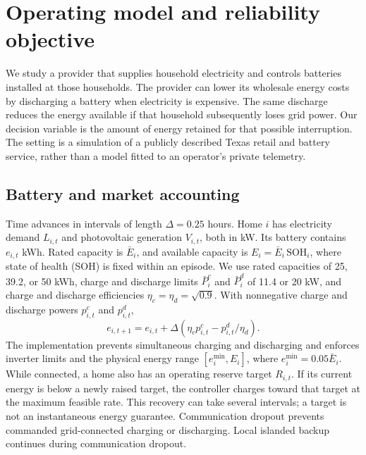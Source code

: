 \section{Operating model and reliability objective}
\label{sec:model}

We study a provider that supplies household electricity and controls batteries installed at those households. The provider can lower its wholesale energy costs by discharging a battery when electricity is expensive. The same discharge reduces the energy available if that household subsequently loses grid power. Our decision variable is the amount of energy retained for that possible interruption. The setting is a simulation of a publicly described Texas retail and battery service, rather than a model fitted to an operator's private telemetry.

\subsection{Battery and market accounting}

Time advances in intervals of length $\Delta=0.25$ hours. Home $i$ has electricity demand $L_{i,t}$ and photovoltaic generation $V_{i,t}$, both in kW. Its battery contains $e_{i,t}$ kWh. Rated capacity is $\bar E_i$, and available capacity is $E_i=\bar E_i\,\mathrm{SOH}_i$, where state of health (SOH) is fixed within an episode. We use rated capacities of 25, 39.2, or 50 kWh, charge and discharge limits $\bar P_i^c$ and $\bar P_i^d$ of 11.4 or 20 kW, and charge and discharge efficiencies $\eta_c=\eta_d=\sqrt{0.9}$. With nonnegative charge and discharge powers $p^c_{i,t}$ and $p^d_{i,t}$,
\begin{equation}
 e_{i,t+1}=e_{i,t}+\Delta\left(\eta_c p^c_{i,t}-p^d_{i,t}/\eta_d\right).
\end{equation}
The implementation prevents simultaneous charging and discharging and enforces inverter limits and the physical energy range $[e_i^{\min},E_i]$, where $e_i^{\min}=0.05\bar E_i$. While connected, a home also has an operating reserve target $R_{i,t}$. If its current energy is below a newly raised target, the controller charges toward that target at the maximum feasible rate. This recovery can take several intervals; a target is not an instantaneous energy guarantee. Communication dropout prevents commanded grid-connected charging or discharging. Local islanded backup continues during communication dropout.

